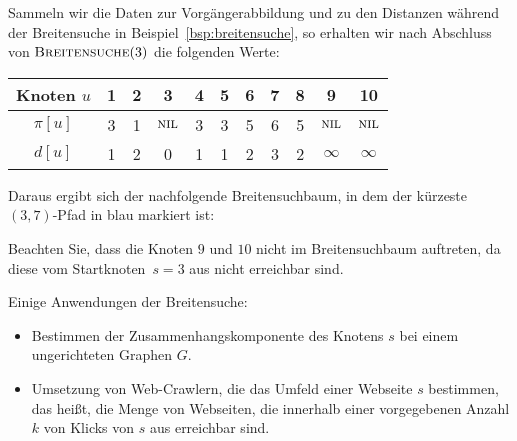 \begin{bsp}
Sammeln wir die Daten zur Vorgängerabbildung und zu den Distanzen während der Breitensuche in Beispiel~\ref{bsp:breitensuche}, so erhalten wir nach Abschluss von $\mathop{\text{\textsc{Breitensuche}}}(3)$ die folgenden Werte:

\begin{table}[H]
\centering
\begin{tabular}{|c|c|c|c|c|c|c|c|c|c|c|}
\hline
\textbf{Knoten $u$}        & \textbf{1} & \textbf{2} & \textbf{3} & \textbf{4} & \textbf{5} & \textbf{6} & \textbf{7} & \textbf{8} & \textbf{9} & \textbf{10} \\ \hline
\textbf{$\pi[u]$}    & 3          & 1          & $\mathop{\text{\textsc{nil}}}$          & 3          & 3          & 5          & 6         & 5         & $\mathop{\text{\textsc{nil}}}$         & $\mathop{\text{\textsc{nil}}}$          \\ \hline
\textbf{$d[u]$} & 1          & 2          & 0         & 1          & 1         & 2         & 3         & 2         & $\infty$         & $\infty$          \\ \hline
\end{tabular}
\end{table}

Daraus ergibt sich der nachfolgende Breitensuchbaum, in dem der kürzeste $(3,7)$-Pfad in blau markiert ist:

\begin{center} 
\end{center} 

Beachten Sie, dass die Knoten $9$ und $10$ nicht im Breitensuchbaum auftreten, da diese vom Startknoten~$s=3$ aus nicht erreichbar sind.
\end{bsp}

\begin{bem} Einige Anwendungen der Breitensuche: 
	\begin{itemize} 
		\item Bestimmen der Zusammenhangskomponente des Knotens $s$ bei einem ungerichteten Graphen $G$. 
		\item Umsetzung von Web-Crawlern, die das Umfeld einer Webseite $s$ bestimmen, das hei\ss t, die Menge von Webseiten, die innerhalb einer vorgegebenen Anzahl $k$ von Klicks von $s$ aus erreichbar sind. 
	\end{itemize}
\end{bem} 


